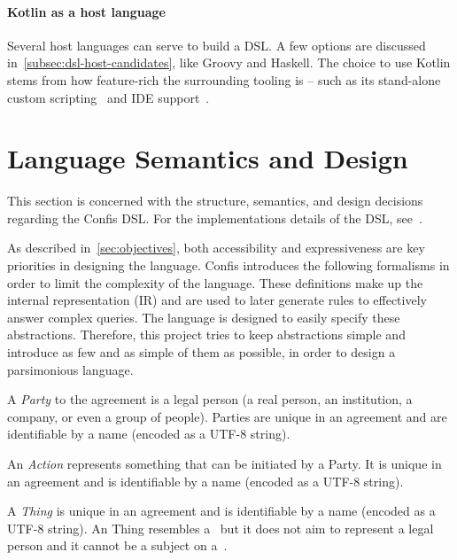 \paragraph{Kotlin as a host language} Several host languages can serve to build a DSL.
A few options are discussed in~\autoref{subsec:dsl-host-candidates}, like Groovy and Haskell.
The choice to use Kotlin stems from how feature-rich the surrounding tooling is -- such as its stand-alone custom scripting~\cite{kotlinScriptKeep} and IDE support~\cite{intelliJRepo}.


\section{Language Semantics and Design}\label{sec:language-semantics}

This section is concerned with the structure, semantics, and design decisions regarding the Confis DSL.
For the implementations details of the DSL, see~.

As described in~\autoref{sec:objectives}, both accessibility and expressiveness are key priorities in designing the language.
Confis introduces the following formalisms in order to limit the complexity of the language.
These definitions make up the internal representation (IR) and are used to later generate rules to effectively answer complex queries.
The language is designed to easily specify these abstractions.
Therefore, this project tries to keep abstractions simple and introduce as few and as simple of them as possible, in order to design a parsimonious language.

\begin{definition}[Party]
    \label{def:party}

    A \emph{Party} to the agreement is a legal person (a real person, an institution, a company, or even a group of people).
    Parties are unique in an agreement and are identifiable by a name (encoded as a UTF-8 string).
\end{definition}

\begin{definition}[Action]
    \label{def:action}
    An \emph{Action} represents something that can be initiated by a Party.
    It is unique in an agreement and is identifiable by a name (encoded as a UTF-8 string).
\end{definition}

\begin{definition}[Thing]
    \label{def:thing}
    A \emph{Thing} is unique in an agreement and is identifiable by a name (encoded as a UTF-8 string).
    An Thing resembles a~ but it does not aim to represent a legal person and it cannot be a subject on a~.
\end{definition}

